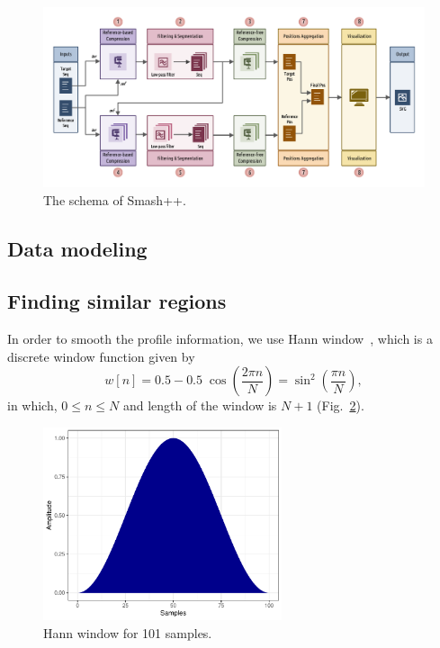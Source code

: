 \begin{figure}[!h]
\includegraphics[width=\linewidth]{schema.pdf}
\caption{The schema of Smash++.}
\label{fig.schema}
\end{figure}

\subsection{Data modeling}

\subsection{Finding similar regions}

In order to smooth the profile information, we use Hann window~\cite{blackman1959particular}, which is a discrete window function given by
\begin{equation}
  \label{eq.hann}
  w[n]=0.5-0.5\;\cos \left({\frac {2\pi n}{N}}\right)=\sin ^{2}\left({\frac {\pi n}{N}}\right),
\end{equation}
in which, $0\le n\le N$ and length of the window is $N+1$ (Fig.~\ref{fig.hann}).

\begin{figure}[!h]
  \centering
\includegraphics[width=7cm]{hann.pdf}
\caption{Hann window for 101 samples.}
\label{fig.hann}
\end{figure}

